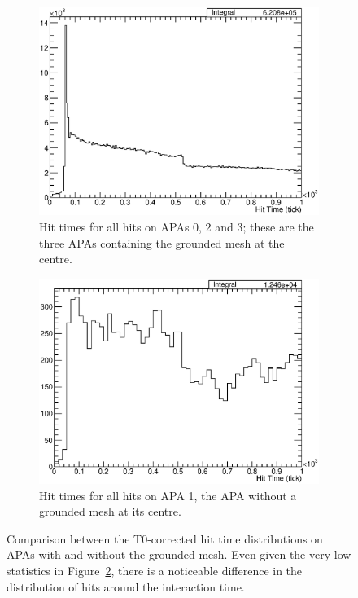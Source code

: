 \begin{figure}
  \centering
  \begin{subfigure}[t]{0.48\linewidth}
    \centering
    \includegraphics[width=\textwidth]{HitTimesAPA023.eps}
    \caption{Hit times for all hits on APAs 0, 2 and 3; these are the three APAs containing the grounded mesh at the centre.}
    \label{fig:HitTimesAPA023}
  \end{subfigure}
  \hfill
  \begin{subfigure}[t]{0.48\linewidth}
    \centering
    \includegraphics[width=\textwidth]{HitTimesAPA1.eps}
    \caption{Hit times for all hits on APA 1, the APA without a grounded mesh at its centre.}
    \label{fig:HitTimesAPA1}
  \end{subfigure}
  \caption[Comparison between the T0-corrected hit time distributions on APAs with and without the grounded mesh.]{Comparison between the T0-corrected hit time distributions on APAs with and without the grounded mesh.  Even given the very low statistics in Figure~\ref{fig:HitTimesAPA1}, there is a noticeable difference in the distribution of hits around the interaction time.}
  \label{fig:HitTimesAPAs}
\end{figure}

